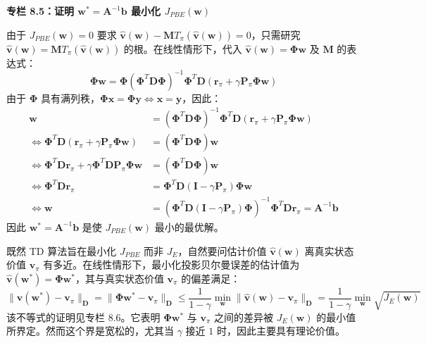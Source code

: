 \documentclass[UTF8]{article}
\begin{document}
\begin{proofbox}
\textbf{专栏 8.5：证明 $\boldsymbol{w}^* = \boldsymbol{A}^{-1}\boldsymbol{b}$ 最小化 $J_{PBE}(\boldsymbol{w})$}

由于 $J_{PBE}(\boldsymbol{w}) = 0$ 要求 $\hat{\boldsymbol{v}}(\boldsymbol{w}) - \boldsymbol{M} T_\pi(\hat{\boldsymbol{v}}(\boldsymbol{w})) = 0$，只需研究 $\hat{\boldsymbol{v}}(\boldsymbol{w}) = \boldsymbol{M} T_\pi(\hat{\boldsymbol{v}}(\boldsymbol{w}))$ 的根。在线性情形下，代入 $\hat{\boldsymbol{v}}(\boldsymbol{w}) = \boldsymbol{\Phi}\boldsymbol{w}$ 及 $\boldsymbol{M}$ 的表达式：
\[
\boldsymbol{\Phi}\boldsymbol{w} = \boldsymbol{\Phi}(\boldsymbol{\Phi}^T\boldsymbol{D}\boldsymbol{\Phi})^{-1}\boldsymbol{\Phi}^T\boldsymbol{D}(\boldsymbol{r}_\pi + \gamma \boldsymbol{P}_\pi \boldsymbol{\Phi}\boldsymbol{w})
\]
由于 $\boldsymbol{\Phi}$ 具有满列秩，$\boldsymbol{\Phi}\boldsymbol{x} = \boldsymbol{\Phi}\boldsymbol{y} \iff \boldsymbol{x} = \boldsymbol{y}$，因此：
\[
\begin{aligned}
\boldsymbol{w} &= (\boldsymbol{\Phi}^T\boldsymbol{D}\boldsymbol{\Phi})^{-1}\boldsymbol{\Phi}^T\boldsymbol{D}(\boldsymbol{r}_\pi + \gamma \boldsymbol{P}_\pi \boldsymbol{\Phi}\boldsymbol{w}) \\
\iff \boldsymbol{\Phi}^T\boldsymbol{D}(\boldsymbol{r}_\pi + \gamma \boldsymbol{P}_\pi \boldsymbol{\Phi}\boldsymbol{w}) &= (\boldsymbol{\Phi}^T\boldsymbol{D}\boldsymbol{\Phi})\boldsymbol{w} \\
\iff \boldsymbol{\Phi}^T\boldsymbol{D}\boldsymbol{r}_\pi + \gamma\boldsymbol{\Phi}^T\boldsymbol{D}\boldsymbol{P}_\pi\boldsymbol{\Phi}\boldsymbol{w} &= (\boldsymbol{\Phi}^T\boldsymbol{D}\boldsymbol{\Phi})\boldsymbol{w} \\
\iff \boldsymbol{\Phi}^T\boldsymbol{D}\boldsymbol{r}_\pi &= \boldsymbol{\Phi}^T\boldsymbol{D}(\boldsymbol{I} - \gamma\boldsymbol{P}_\pi)\boldsymbol{\Phi}\boldsymbol{w} \\
\iff \boldsymbol{w} &= (\boldsymbol{\Phi}^T\boldsymbol{D}(\boldsymbol{I} - \gamma\boldsymbol{P}_\pi)\boldsymbol{\Phi})^{-1}\boldsymbol{\Phi}^T\boldsymbol{D}\boldsymbol{r}_\pi = \boldsymbol{A}^{-1}\boldsymbol{b}
\end{aligned}
\]
因此 $\boldsymbol{w}^* = \boldsymbol{A}^{-1}\boldsymbol{b}$ 是使 $J_{PBE}(\boldsymbol{w})$ 最小的最优解。
\end{proofbox}

既然 TD 算法旨在最小化 $J_{PBE}$ 而非 $J_E$，自然要问估计价值 $\hat{\boldsymbol{v}}(\boldsymbol{w})$ 离真实状态价值 $\boldsymbol{v}_\pi$ 有多近。在线性情形下，最小化投影贝尔曼误差的估计值为 $\hat{\boldsymbol{v}}(\boldsymbol{w}^*) = \boldsymbol{\Phi}\boldsymbol{w}^*$，其与真实状态价值 $\boldsymbol{v}_\pi$ 的偏差满足：
\[
\|\hat{\boldsymbol{v}}(\boldsymbol{w}^*) - \boldsymbol{v}_\pi\|_{\boldsymbol{D}} = \|\boldsymbol{\Phi}\boldsymbol{w}^* - \boldsymbol{v}_\pi\|_{\boldsymbol{D}}
    \leq \frac{1}{1-\gamma} \min_{\boldsymbol{w}} \|\hat{\boldsymbol{v}}(\boldsymbol{w}) - \boldsymbol{v}_\pi\|_{\boldsymbol{D}}
    = \frac{1}{1-\gamma} \min_{\boldsymbol{w}} \sqrt{J_E(\boldsymbol{w})}
\]
该不等式的证明见专栏 8.6。它表明 $\boldsymbol{\Phi}\boldsymbol{w}^*$ 与 $\boldsymbol{v}_\pi$ 之间的差异被 $J_E(\boldsymbol{w})$ 的最小值所界定。然而这个界是宽松的，尤其当 $\gamma$ 接近 $1$ 时，因此主要具有理论价值。
\end{document}

